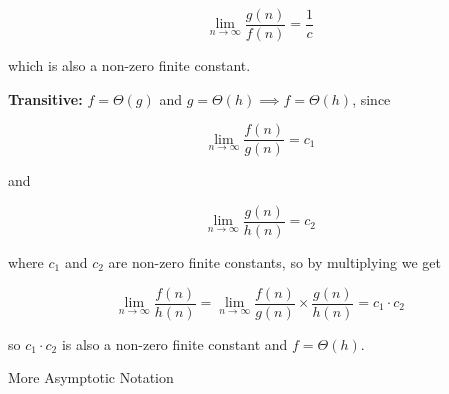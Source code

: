 \documentclass[../main.tex]{subfiles}
\begin{document}
\begin{questions}
\begin{parts}
\begin{solution}
      $$
      \lim_{n\to\infty} \frac{g(n)}{f(n)} = \frac{1}{c}
      $$

      which is also a non-zero finite constant.

      \textbf{Transitive:} $f = \Theta(g)$ and $g = \Theta(h) \implies f = \Theta(h)$, since

      $$
      \lim_{n\to\infty} \frac{f(n)}{g(n)} = c_1
      $$

      and

      $$
      \lim_{n\to\infty} \frac{g(n)}{h(n)} = c_2
      $$

      where $c_1$ and $c_2$ are non-zero finite constants, so by multiplying we get

      $$
      \lim_{n\to\infty} \frac{f(n)}{h(n)} = \lim_{n\to\infty} \frac{f(n)}{g(n)} \times \frac{g(n)}{h(n)} = c_1 \cdot c_2
      $$

      so $c_1 \cdot c_2$ is also a non-zero finite constant and $f = \Theta(h)$.
    \end{solution}
  \end{parts}

  \question More Asymptotic Notation

\end{questions}
\end{document}
